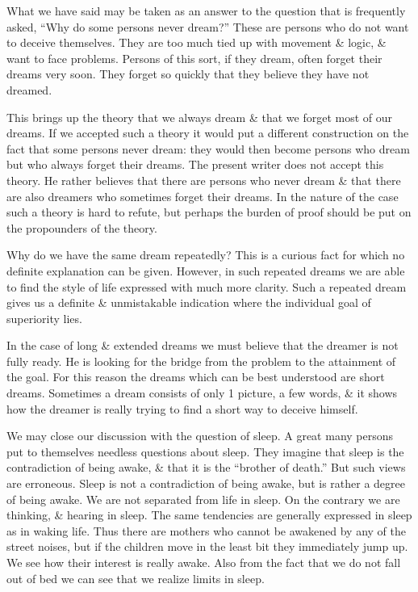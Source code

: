 \documentclass{article}
\numberwithin{equation}{section}
\begin{document}
What we have said may be taken as an answer to the question that is frequently asked, ``Why do some persons never dream?'' These are persons who do not want to deceive themselves. They are too much tied up with movement \& logic, \& want to face problems. Persons of this sort, if they dream, often forget their dreams very soon. They forget so quickly that they believe they have not dreamed.

This brings up the theory that we always dream \& that we forget most of our dreams. If we accepted such a theory it would put a different construction on the fact that some persons never dream: they would then become persons who dream but who always forget their dreams. The present writer does not accept this theory. He rather believes that there are persons who never dream \& that there are also dreamers who sometimes forget their dreams. In the nature of the case such a theory is hard to refute, but perhaps the burden of proof should be put on the propounders of the theory.

Why do we have the same dream repeatedly? This is a curious fact for which no definite explanation can be given. However, in such repeated dreams we are able to find the style of life expressed with much more clarity. Such a repeated dream gives us a definite \& unmistakable indication where the individual goal of superiority lies.

In the case of long \& extended dreams we must believe that the dreamer is not fully ready. He is looking for the bridge from the problem to the attainment of the goal. For this reason the dreams which can be best understood are short dreams. Sometimes a dream consists of only 1 picture, a few words, \& it shows how the dreamer is really trying to find a short way to deceive himself.

We may close our discussion with the question of sleep. A great many persons put to themselves needless questions about sleep. They imagine that sleep is the contradiction of being awake, \& that it is the ``brother of death.'' But such views are erroneous. Sleep is not a contradiction of being awake, but is rather a degree of being awake. We are not separated from life in sleep. On the contrary we are thinking, \& hearing in sleep. The same tendencies are generally expressed in sleep as in waking life. Thus there are mothers who cannot be awakened by any of the street noises, but if the children move in the least bit they immediately jump up. We see how their interest is really awake. Also from the fact that we do not fall out of bed we can see that we realize limits in sleep.
\end{document}
